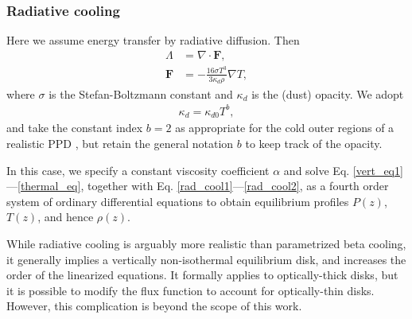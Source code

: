 \subsubsection{Radiative cooling}\label{rad_cool}
Here we assume energy transfer by radiative diffusion. Then
\begin{align}
  \Lambda &= \nabla\cdot\bm{F},\label{rad_cool1}\\
  \bm{F}   &= -\frac{16\sigma T^3}{3\kappa_d\rho}\nabla T, \label{rad_cool2}
\end{align}
where $\sigma$ is the Stefan-Boltzmann constant and 
$\kappa_d$ is the (dust) opacity. We adopt
\begin{align}\label{opacity_law}
  \kappa_d = \kappa_{d0}T^b,
\end{align}
and take the constant index $b=2$ as appropriate for the cold outer regions
of a realistic PPD \citep{bell94}, but retain the general notation $b$
to keep track of the opacity.    

In this case, we specify a constant viscosity coefficient $\alpha$ and
solve Eq. \ref{vert_eq1}---\ref{thermal_eq}, together with
Eq. \ref{rad_cool1}---\ref{rad_cool2}, as a fourth order system of
ordinary differential equations to obtain equilibrium profiles $P(z)$, $T(z)$, and hence
$\rho(z)$.  

While radiative cooling is arguably more realistic than
parametrized beta cooling, it generally implies a vertically
non-isothermal equilibrium disk, and increases the order of the
linearized equations. It formally applies to optically-thick 
disks, but it is possible to modify the flux function to account
for optically-thin disks. However, this complication is beyond the scope of
this work. 


